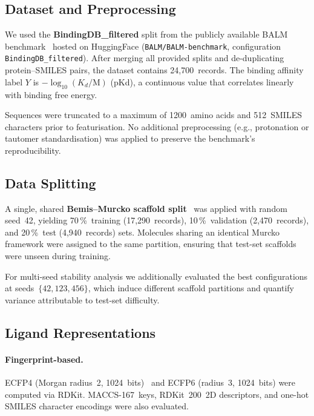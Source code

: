 \documentclass[11pt,twocolumn]{article}
\begin{document}
\subsection{Dataset and Preprocessing}

We used the \textbf{BindingDB\_filtered} split from the publicly available
BALM benchmark~\cite{balm2025jcim} hosted on HuggingFace
(\texttt{BALM/BALM-benchmark}, configuration \texttt{BindingDB\_filtered}).
After merging all provided splits and de-duplicating protein--SMILES pairs,
the dataset contains 24,700~records.  The binding affinity label $Y$ is
$-\log_{10}(K_d/\text{M})$ (pKd), a continuous value that correlates
linearly with binding free energy.

Sequences were truncated to a maximum of 1200~amino acids and 512~SMILES
characters prior to featurisation.  No additional preprocessing (e.g.,
protonation or tautomer standardisation) was applied to preserve the
benchmark's reproducibility.

\subsection{Data Splitting}

A single, shared \textbf{Bemis--Murcko scaffold split}~\cite{bemis1996scaffolds}
was applied with random seed~42, yielding 70\,\%~training (17,290~records),
10\,\%~validation (2,470~records), and 20\,\%~test (4,940~records) sets.
Molecules sharing an identical Murcko framework were assigned to the same
partition, ensuring that test-set scaffolds were unseen during training.

For multi-seed stability analysis we additionally evaluated the best
configurations at seeds~$\{42, 123, 456\}$, which induce different scaffold
partitions and quantify variance attributable to test-set difficulty.

\subsection{Ligand Representations}

\paragraph{Fingerprint-based.}
ECFP4 (Morgan radius~2, 1024~bits)~\cite{rogers2010ecfp} and ECFP6
(radius~3, 1024~bits) were computed via RDKit.  MACCS-167~keys,
RDKit~200~2D descriptors, and one-hot SMILES character encodings were also
evaluated.
\end{document}
